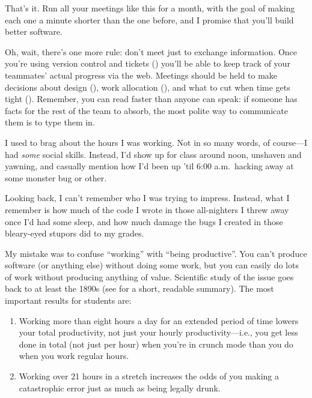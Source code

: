 \documentclass{report}
\begin{document}
That's it.  Run all your meetings like this for a month, with the goal
of making each one a minute shorter than the one before, and I promise
that you'll build better software.

Oh, wait, there's one more rule: don't meet just to exchange
information.  Once you're using version control and tickets
() you'll be able to keep track of your teammates'
actual progress via the web.  Meetings should be held to make
decisions about design (), work allocation
(), and what to cut when time gets tight
().  Remember, you can read faster
than anyone can speak: if someone has facts for the rest of the team
to absorb, the most polite way to communicate them is to type them in.


I used to brag about the hours I was working.  Not in so many words,
of course---I had \emph{some} social skills.  Instead, I'd show up for
class around noon, unshaven and yawning, and casually mention how I'd
been up 'til 6:00 a.m.\ hacking away at some monster bug or other.

Looking back, I can't remember who I was trying to impress.  Instead,
what I remember is how much of the code I wrote in those all-nighters
I threw away once I'd had some sleep, and how much damage the bugs I
created in those bleary-eyed stupors did to my grades.

My mistake was to confuse ``working'' with ``being productive''.  You
can't produce software (or anything else) without doing some work, but
you can easily do lots of work without producing anything of value.
Scientific study of the issue goes back to at least the 1890s (see
\cite{b:robinson-crunch-mode} for a short, readable summary).  The
most important results for students are:

\begin{enumerate}

\item Working more than eight hours a day for an extended period of
time lowers your total productivity, not just your hourly
productivity---i.e., you get less done in total (not just per hour)
when you're in crunch mode than you do when you work regular hours.

\item Working over 21 hours in a stretch increases the odds of you
making a catastrophic error just as much as being legally drunk.

\end{enumerate}
\end{document}
